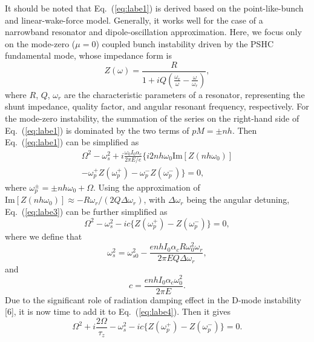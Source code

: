 \documentclass[%
 reprint,
 amsmath,amssymb,
 aps,
]{revtex4-1}
\begin{document}
It should be noted that Eq.~(\ref{eq:labe1}) is derived based on the point-like-bunch and linear-wake-force model. Generally, it works well for the case of a narrowband resonator and dipole-oscillation approximation. Here, we focus only on the mode-zero ($\mu=0$) coupled bunch instability driven by the PSHC fundamental mode, whose impedance form is
\begin{equation}\label{eq:labe2}
   Z(\omega)=\frac{R}{1+iQ(\frac{\omega_r}{\omega}-\frac{\omega}{\omega_r})},
\end{equation}
where $R$, $Q$, $\omega_r$ are the characteristic parameters of a resonator, representing the shunt impedance, quality factor, and angular resonant frequency, respectively. For the mode-zero instability, the summation of the series on the right-hand side of Eq.~(\ref{eq:labe1}) is dominated by the two terms of $pM=\pm nh$. Then Eq.~(\ref{eq:labe1}) can be simplified as 
\begin{equation}\label{eq:labe3}
   \begin{aligned}
   \Omega^2-\omega^2_s + i\frac{\omega_0 I_0 \alpha_c}{2\pi E/e}\{i2nh\omega_0 \mathrm{Im}[Z(nh\omega_0)]\\
   -\omega^{+}_p Z(\omega^{+}_p)-\omega^{-}_p Z(\omega^{-}_p)\}=0,
   \end{aligned}
\end{equation}
where $\omega_p^{\pm}=\pm n h \omega_0 + \Omega$. Using the approximation of $\mathrm{Im}[Z(nh\omega_0)]\approx - R\omega_r/(2Q\Delta \omega_r)$, with $\Delta \omega_r$ being the angular detuning, Eq.~(\ref{eq:labe3}) can be further simplified as
\begin{equation}\label{eq:labe4}
   \Omega^2-\omega^2_s-ic\{Z(\omega^{+}_p)-Z(\omega^{-}_p)\}=0,
\end{equation}
where we define that
\begin{equation}\label{eq:labe5}
   \omega^2_s=\omega^2_{s0}-\frac{enh I_0 \alpha_c R \omega^2_0 \omega_r}{2 \pi E Q \Delta \omega_r},
\end{equation}
and 
\begin{equation}\label{eq:labe6}
   c=\frac{enh I_0 \alpha_c \omega^2_0}{2 \pi E}.
\end{equation}
Due to the significant role of radiation damping effect in the D-mode instability [6], it is now time to add it to Eq.~(\ref{eq:labe4}). Then it gives
\begin{equation}\label{eq:labe7}
   \Omega^2+i\frac{2\Omega}{\tau_z}-\omega^2_s-ic\{Z(\omega^{+}_p)-Z(\omega^{-}_p)\}=0.
\end{equation}
\end{document}
